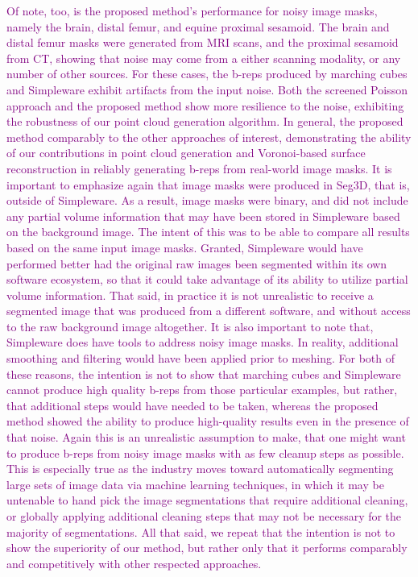 \textcolor{purple}{Of note, too, is the proposed method's performance for noisy image masks, namely the brain, distal femur, and equine proximal sesamoid. The brain and distal femur masks were generated from MRI scans, and the proximal sesamoid from CT, showing that noise may come from a either scanning modality, or any number of other sources. For these cases, the b-reps produced by marching cubes and Simpleware exhibit artifacts from the input noise. Both the screened Poisson approach and the proposed method show more resilience to the noise, exhibiting the robustness of our point cloud generation algorithm. In general, the proposed method comparably to the other approaches of interest, demonstrating the ability of our contributions in point cloud generation and Voronoi-based surface reconstruction in reliably generating b-reps from real-world image masks.
%
It is important to emphasize again that image masks were produced in Seg3D, that is, outside of Simpleware. As a result, image masks were binary, and did not include any partial volume information that may have been stored in Simpleware based on the background image. The intent of this was to be able to compare all results based on the same input image masks. Granted, Simpleware would have performed better had the original raw images been segmented within its own software ecosystem, so that it could take advantage of its ability to utilize partial volume information. That said, in practice it is not unrealistic to receive a segmented image that was produced from a different software, and without access to the raw background image altogether. It is also important to note that, Simpleware does have tools to address noisy image masks. In reality, additional smoothing and filtering would have been applied prior to meshing. For both of these reasons, the intention is not to show that marching cubes and Simpleware cannot produce high quality b-reps from those particular examples, but rather, that additional steps would have needed to be taken, whereas the proposed method showed the ability to produce high-quality results even in the presence of that noise. Again this is an unrealistic assumption to make, that one might want to produce b-reps from noisy image masks with as few cleanup steps as possible. This is especially true as the industry moves toward automatically segmenting large sets of image data via machine learning techniques, in which it may be untenable to hand pick the image segmentations that require additional cleaning, or globally applying additional cleaning steps that may not be necessary for the majority of segmentations. All that said, we repeat that the intention is not to show the superiority of our method, but rather only that it performs comparably and competitively with other respected approaches.}